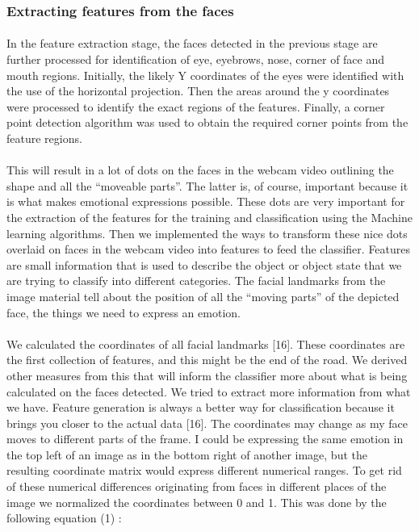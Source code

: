 \documentclass[a4paper,12pt,oneside]{article}
\begin{document}
\subsubsection{Extracting features from the faces}
\paragraph{}
In the feature extraction stage, the faces detected in the
previous stage are further processed for identification of
eye, eyebrows, nose, corner of face and mouth regions.
Initially, the likely Y coordinates of the eyes were
identified with the use of the horizontal projection. Then
the areas around the y coordinates were processed to
identify the exact regions of the features. Finally, a
corner point detection algorithm was used to obtain the
required corner points from the feature regions.

\paragraph{}
This will result in a lot of dots on the faces in the webcam
video outlining the shape and all the “moveable parts”. The latter is, of course, important because it is what
makes emotional expressions possible. These dots are
very important for the extraction of the features for the
training and classification using the Machine learning
algorithms. Then we implemented the ways to transform
these nice dots overlaid on faces in the webcam video
into features to feed the classifier. Features are small
information that is used to describe the object or object
state that we are trying to classify into
different categories. The facial landmarks from the
image material tell about the position of all the “moving
parts” of the depicted face, the things we need to express
an emotion.

\paragraph{}
We calculated the coordinates of all facial landmarks
[16]. These coordinates are the first collection of
features, and this might be the end of the road. We
derived other measures from this that will inform the
classifier more about what is being calculated on the
faces detected. We tried to extract more information
from what we have. Feature generation is always a better
way for classification because it brings you closer to the
actual data [16]. The coordinates may change as my face
moves to different parts of the frame. I could be
expressing the same emotion in the top left of an image
as in the bottom right of another image, but the resulting
coordinate matrix would express different numerical
ranges. To get rid of these numerical differences
originating from faces in different places of the image we
normalized the coordinates between 0 and 1. This was
done by the following equation (1) :
\end{document}
